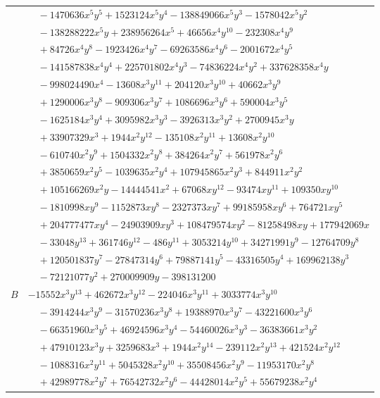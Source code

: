 \documentclass[11pt]{article}
\begin{document}
\begin{longtable}{@{}ll@{}}
 & $\quad -1470636x^{5}y^{5}+1523124x^{5}y^{4}-138849066x^{5}y^{3}-1578042x^{5}y^{2}$\\
 & $\quad -138288222x^{5}y+238956264x^{5}+46656x^{4}y^{10}-232308x^{4}y^{9}$\\
 & $\quad +84726x^{4}y^{8}-1923426x^{4}y^{7}-69263586x^{4}y^{6}-2001672x^{4}y^{5}$\\
 & $\quad -141587838x^{4}y^{4}+225701802x^{4}y^{3}-74836224x^{4}y^{2}+337628358x^{4}y$\\
 & $\quad -998024490x^{4}-13608x^{3}y^{11}+204120x^{3}y^{10}+40662x^{3}y^{9}$\\
 & $\quad +1290006x^{3}y^{8}-909306x^{3}y^{7}+1086696x^{3}y^{6}+590004x^{3}y^{5}$\\
 & $\quad -1625184x^{3}y^{4}+3095982x^{3}y^{3}-3926313x^{3}y^{2}+2700945x^{3}y$\\
 & $\quad +33907329x^{3}+1944x^{2}y^{12}-135108x^{2}y^{11}+13608x^{2}y^{10}$\\
 & $\quad -610740x^{2}y^{9}+1504332x^{2}y^{8}+384264x^{2}y^{7}+561978x^{2}y^{6}$\\
 & $\quad +3850659x^{2}y^{5}-1039635x^{2}y^{4}+107945865x^{2}y^{3}+844911x^{2}y^{2}$\\
 & $\quad +105166269x^{2}y-14444541x^{2}+67068xy^{12}-93474xy^{11}+109350xy^{10}$\\
 & $\quad -1810998xy^{9}-1152873xy^{8}-2327373xy^{7}+99185958xy^{6}+764721xy^{5}$\\
 & $\quad +204777477xy^{4}-24903909xy^{3}+108479574xy^{2}-81258498xy+177942069x$\\
 & $\quad -33048y^{13}+361746y^{12}-486y^{11}+3053214y^{10}+34271991y^{9}-12764709y^{8}$\\
 & $\quad +120501837y^{7}-27847314y^{6}+79887141y^{5}-43316505y^{4}+169962138y^{3}$\\
 & $\quad -72121077y^{2}+270009909y-398131200$\\
$B$ & $-15552x^{3}y^{13}+462672x^{3}y^{12}-224046x^{3}y^{11}+3033774x^{3}y^{10}$\\
 & $\quad -3914244x^{3}y^{9}-31570236x^{3}y^{8}+19388970x^{3}y^{7}-43221600x^{3}y^{6}$\\
 & $\quad -66351960x^{3}y^{5}+46924596x^{3}y^{4}-54460026x^{3}y^{3}-36383661x^{3}y^{2}$\\
 & $\quad +47910123x^{3}y+3259683x^{3}+1944x^{2}y^{14}-239112x^{2}y^{13}+421524x^{2}y^{12}$\\
 & $\quad -1088316x^{2}y^{11}+5045328x^{2}y^{10}+35508456x^{2}y^{9}-11953170x^{2}y^{8}$\\
 & $\quad +42989778x^{2}y^{7}+76542732x^{2}y^{6}-44428014x^{2}y^{5}+55679238x^{2}y^{4}$\\

\end{longtable}
\end{document}
